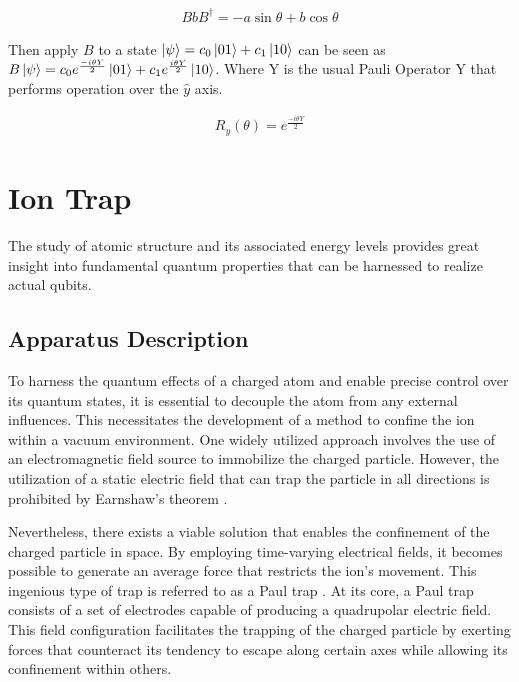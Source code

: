\documentclass[
  journal=largetwo,
  year=2023,
]{cup-journal}
\begin{document}
\begin{equation}
  \begin{aligned}\label{eq:15}
    BbB^{\dag} = -a\sin\theta + b\cos\theta
  \end{aligned}
\end{equation}


Then apply \(B\) to a state \(\ket{\psi} = c_0\ket{01} + c_1\ket{10}\) can be seen as \(B\ket{\psi} = c_0e^{\frac{-i\theta Y}{2}}\ket{01} + c_1e^{\frac{i\theta Y}{2}}\ket{10}\). Where Y is the usual Pauli Operator Y that performs operation over the \(\hat{y}\) axis.

\begin{equation}
  \begin{aligned}\label{eq:15}
    R_y(\theta) = e^{\frac{-i\theta Y}{2}}
  \end{aligned}
\end{equation}



\section{Ion Trap}
\label{cap:ion}
The study of atomic structure and its associated energy levels provides great insight into fundamental quantum properties that can be harnessed to realize actual qubits.

\subsection{Apparatus Description}
\label{sec:apparatus_description}

To harness the quantum effects of a charged atom and enable precise control over its quantum states, it is essential to decouple the atom from any external influences. This necessitates the development of a method to confine the ion within a vacuum environment. One widely utilized approach involves the use of an electromagnetic field source to immobilize the charged particle. However, the utilization of a static electric field that can trap the particle in all directions is prohibited by Earnshaw's theorem \autocite{jones_1980_earnshaws}.

Nevertheless, there exists a viable solution that enables the confinement of the charged particle in space. By employing time-varying electrical fields, it becomes possible to generate an average force that restricts the ion's movement. This ingenious type of trap is referred to as a Paul trap \autocite{paul_1953_notizen}. At its core, a Paul trap consists of a set of electrodes capable of producing a quadrupolar electric field. This field configuration facilitates the trapping of the charged particle by exerting forces that counteract its tendency to escape along certain axes while allowing its confinement within others.
\end{document}
